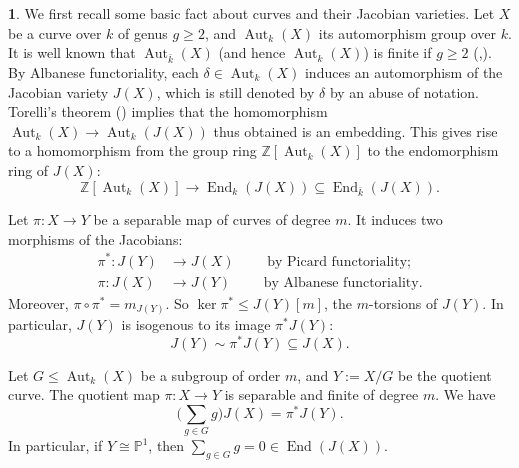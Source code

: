 \documentclass{amsart}[11pt]
\theoremstyle{definition}
\newtheorem{sect}[thm]{}
\numberwithin{equation}{section}
\theoremstyle{notitle}
\begin{document}
\begin{sect} \label{subsec:general-results-about-curves} We first
  recall some basic fact about curves and their Jacobian
  varieties. Let $X$ be a curve over $k$ of genus $g\geq 2$, and
  $\operatorname{Aut}_k(X)$ its automorphism group over $k$. It is well known that
  $\operatorname{Aut}_{\bar{k}}(X)$ (and hence $\operatorname{Aut}_k(X)$) is finite if $g\geq 2$
  (\cite[Exercise IV.5.2]{MR0463157},\cite[Chapter 11]{MR2386879}). By
  Albanese functoriality, each $\delta\in \operatorname{Aut}_k(X)$ induces an
  automorphism of the Jacobian variety $J(X)$, which is still denoted
  by $\delta$ by an abuse of notation. Torelli's theorem
  (\cite[Section 12]{MR861976}) implies that the homomorphism
  $\operatorname{Aut}_k(X)\to \operatorname{Aut}_k(J(X))$ thus obtained is an embedding. This
  gives rise to a homomorphism from the group ring ${\mathbb{Z}}[\operatorname{Aut}_k(X)]$ to
  the endomorphism ring of $J(X)$:
  \begin{equation}
    \label{eq:16}
    {\mathbb{Z}}[\operatorname{Aut}_k(X)]\to \operatorname{End}_k(J(X))\subseteq  \operatorname{End}_{\bar{k}}(J(X)). 
  \end{equation}
 
  Let $\pi: X\to Y$ be a separable map of curves of degree $m$.  It
  induces two morphisms of the Jacobians:
  \begin{align*}
    \pi^*: J(Y)&\to J(X) \qquad \text{ by Picard functoriality};\\
    \pi: J(X)&\to J(Y) \qquad \text{ by  Albanese functoriality}.
  \end{align*}
  Moreover, $\pi\circ \pi^*= m_{J(Y)}$. So $\ker \pi^*\leq J(Y)[m]$,
  the $m$-torsions of $J(Y)$. In particular, $J(Y)$ is isogenous to
  its image $\pi^*J(Y)$:
  \begin{equation}
    \label{eq:15}
    J(Y)\sim \pi^*J(Y)\subseteq J(X). 
  \end{equation}

  Let $G\leq \operatorname{Aut}_k(X)$ be a subgroup of order $m$, and $Y:=X/G$ be
  the quotient curve. The quotient map $\pi: X\to Y$ is separable and
  finite of degree $m$.  We have 
\begin{equation}
  \label{eq:17}
  \big(\sum_{g\in G} g\big) J(X)= \pi^*J(Y).
\end{equation}
In particular, if $Y\cong {\mathbb{P}}^1$, then $\sum_{g\in G}
g=0\in \operatorname{End}(J(X))$. 

\end{sect}
\end{document}
